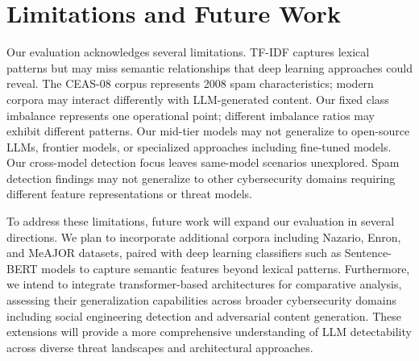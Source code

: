\section{Limitations and Future Work}
\label{sec:limitations}

Our evaluation acknowledges several limitations. TF-IDF captures lexical patterns but may miss semantic relationships that deep learning approaches could reveal. The CEAS-08 corpus represents 2008 spam characteristics; modern corpora may interact differently with LLM-generated content. Our fixed class imbalance represents one operational point; different imbalance ratios may exhibit different patterns. Our mid-tier models may not generalize to open-source LLMs, frontier models, or specialized approaches including fine-tuned models. Our cross-model detection focus leaves same-model scenarios unexplored. Spam detection findings may not generalize to other cybersecurity domains requiring different feature representations or threat models.

To address these limitations, future work will expand our evaluation in several directions. We plan to incorporate additional corpora including Nazario, Enron, and MeAJOR datasets, paired with deep learning classifiers such as Sentence-BERT models to capture semantic features beyond lexical patterns. Furthermore, we intend to integrate transformer-based architectures for comparative analysis, assessing their generalization capabilities across broader cybersecurity domains including social engineering detection and adversarial content generation. These extensions will provide a more comprehensive understanding of LLM detectability across diverse threat landscapes and architectural approaches.
